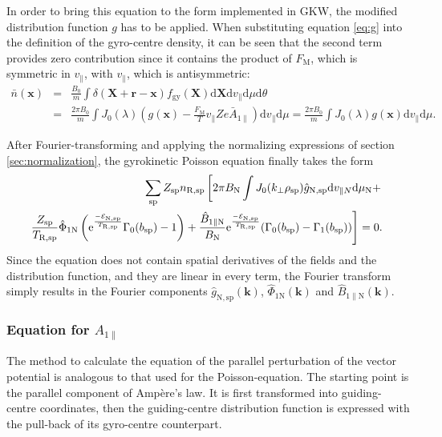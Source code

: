 \documentclass[a4paper,10pt]{article}
\newcommand{\st}[1]{\mathrm{#1}} %
\renewcommand{\vec}[1]{\mathbf{#1}}
\begin{document}
In order to bring this equation to the form implemented in GKW, the modified distribution function $g$ has to be applied. When substituting equation \ref{eq:g} into the definition of the gyro-centre density, it can be seen that the second term provides zero contribution since it contains the product of $F_{\st{M}}$, which is symmetric in $v_{\parallel}$, with $v_{\parallel}$, which is antisymmetric:
\begin{eqnarray*}
	\bar{n}(\vec{x}) &=& \frac{B_0}{m} \int \delta(\vec{X}+\vec{r}-\vec{x}) f_{\st{gy}}(\vec{X}) \mathrm{d} \vec{X} \mathrm{d} v_{\parallel} \mathrm{d} \mu \mathrm{d} \theta \\
	&=& \frac{2 \pi B_0}{m} \int J_0(\lambda) \left( g(\vec{x}) - \frac{F_{\st{M}}}{T} v_{\parallel} Z e \bar{A}_{1 \parallel}\right) \mathrm{d}v_{\parallel} \mathrm{d} \mu = \frac{2 \pi B_0}{m} \int J_0(\lambda) g(\vec{x}) \mathrm{d}v_{\parallel} \mathrm{d} \mu.
	\label{eq:density_gkw_nonorm}
\end{eqnarray*}

After Fourier-transforming and applying the normalizing expressions of section \ref{sec:normalization}, the gyrokinetic Poisson equation finally takes the form
\begin{eqnarray}
	\hspace{-5mm}
	&& \sum_{\st{sp}} Z_{\st{sp}} n_{\st{R,sp}} \left[ 2 \pi B_{\st{N}} \int J_0(k_{\perp} \rho_{\st{sp}}) \hat{g}_{\st{N,sp}} \mathrm{d} v_{\parallel N} \mathrm{d} \mu_{\st{N}} + \right. \nonumber \\ 
	\hspace{-5mm}
	&& \left. \frac{Z_{\st{sp}}}{T_{\st{R,sp}}} \hat{\Phi}_{1 \st{N}} \left( \st{e}^{\frac{-\mathcal{E}_{\st{N,sp}}}{T_{\st{R,sp}}}} \Gamma_0(b_{\st{sp}}) - 1 \right) + \frac{\hat{B}_{1 \parallel \st{N}}}{B_{\st{N}}} \st{e}^{\frac{-\mathcal{E}_{\st{N,sp}}}{T_{\st{R,sp}}}} (\Gamma_0(b_{\st{sp}}) - \Gamma_1(b_{\st{sp}})) \right] = 0.
	\label{eq:poisson}
\end{eqnarray}
Since the equation does not contain spatial derivatives of the fields and the distribution function, and they are linear in every term, the Fourier transform simply results in the Fourier components $\hat{g}_{\st{N,sp}}(\vec{k})$, $\hat{\Phi}_{1 \st{N}}(\vec{k})$ and $\hat{B}_{1 \parallel \st{N}}(\vec{k})$.

\subsubsection{Equation for $A_{1 \parallel}$}
The method to calculate the equation of the parallel perturbation of the vector potential is analogous to that used for the Poisson-equation.
The starting point is the parallel component of Amp\`ere's law. It is first transformed into guiding-centre coordinates, then the guiding-centre distribution function is expressed with the pull-back of its gyro-centre counterpart. 
\end{document}

